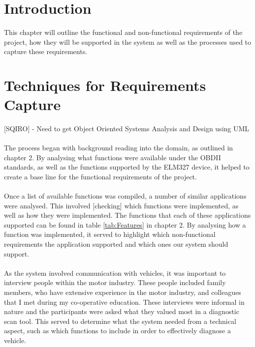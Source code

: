 \section{Introduction}
	\paragraph{}{
	This chapter will outline the functional and non-functional requirements of the project, how they will be supported in the system as well as the processes used to capture these requirements.
	}		

\section{Techniques for Requirements Capture}	
	\paragraph{}{
	[SQIRO] - Need to get Object Oriented Systems Analysis and Design using UML
	}
	\paragraph{}{
	The process began with background reading into the domain, as outlined in chapter 2. By analysing what functions were available under the OBDII standards, as well as the functions supported by the ELM327 device, it helped to create a base line for the functional requirements of the project.
	}	
	\paragraph{}{
	Once a list of available functions was compiled, a number of similar applications were analysed. This involved [checking] which functions were implemented, as well as how they were implemented. The functions that each of these applications supported can be found in table \ref{tab:Features} in chapter 2. By analysing how a function was implemented, it served to highlight which non-functional requirements the application supported and which ones our system should support.
	}
	\paragraph{}{
	As the system involved communication with vehicles, it was important to interview people within the motor industry. These people included family members, who have extensive experience in the motor industry, and colleagues that I met during my co-operative education. These interviews were informal in nature and the participants were asked what they valued most in a diagnostic scan tool. This served to determine what the system needed from a technical aspect, such as which functions to include in order to effectively diagnose a vehicle.  
	}

